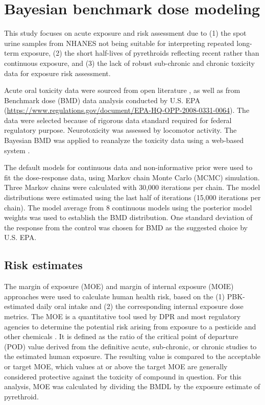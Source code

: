 \documentclass[toxics,article,submit,pdftex,moreauthors]{Definitions/mdpi}
\begin{document}
\section{Bayesian benchmark dose
modeling}\label{bayesian-benchmark-dose-modeling}

This study focuses on acute exposure and risk assessment due to (1) the
spot urine samples from NHANES not being suitable for interpreting
repeated long-term exposure, (2) the short half-lives of pyrethroids
reflecting recent rather than continuous exposure, and (3) the lack of
robust sub-chronic and chronic toxicity data for exposure risk
assessment.

Acute oral toxicity data were sourced from open literature
\citep{wolansky_relative_2006}, as well as from Benchmark dose (BMD)
data analysis conducted by U.S. EPA
(\url{https://www.regulations.gov/document/EPA-HQ-OPP-2008-0331-0064}).
The data were selected because of rigorous data standard required for
federal regulatory purpose. Neurotoxicity was assessed by locomotor
activity. The Bayesian BMD was applied to reanalyze the toxicity data
using a web-based system \citep{shao_kan_web_2018}.

The default models for continuous data and non-informative prior were
used to fit the dose-response data, using Markov chain Monte Carlo
(MCMC) simulation. Three Markov chains were calculated with 30,000
iterations per chain. The model distributions were estimated using the
last half of iterations (15,000 iterations per chain). The model average
from 8 continuous models using the posterior model weights was used to
establish the BMD distribution. One standard deviation of the response
from the control was chosen for BMD as the suggested choice by U.S. EPA.

\subsection{Risk estimates}\label{risk-estimates}

The margin of exposure (MOE) and margin of internal exposure (MOIE)
approaches were used to calculate human health risk, based on the (1)
PBK-estimated daily oral intake and (2) the corresponding internal
exposure dose metrics. The MOE is a quantitative tool used by DPR and
most regulatory agencies to determine the potential risk arising from
exposure to a pesticide and other chemicals
\citep{beaudouin2010stochastic, beauvais_human_2010}. It is defined as
the ratio of the critical point of departure (POD) value derived from
the definitive acute, sub-chronic, or chronic studies to the estimated
human exposure. The resulting value is compared to the acceptable or
target MOE, which values at or above the target MOE are generally
considered protective against the toxicity of compound in question. For
this analysis, MOE was calculated by dividing the BMDL by the exposure
estimate of pyrethroid.
\end{document}
